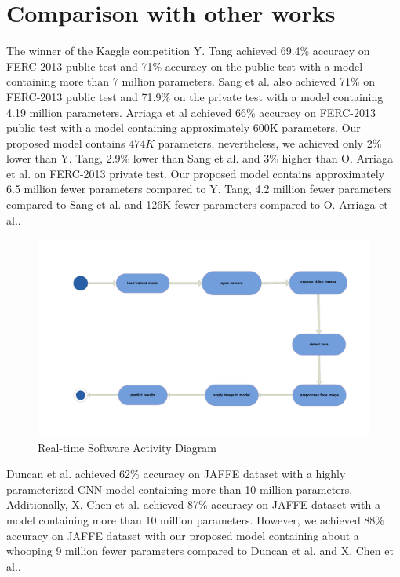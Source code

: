 \documentclass[master]{thesis-uestc}
\begin{document}
\section{Comparison with other works}
The winner of the Kaggle competition Y. Tang achieved 69.4\% accuracy on FERC-2013 public test and 71\% accuracy on the public test with a model containing more than 7 million parameters. Sang et al. also achieved 71\% on FERC-2013 public test and 71.9\% on the private test with a model containing 4.19 million parameters. Arriaga et al achieved 66\% accuracy on FERC-2013 public test with a model containing approximately 600K parameters. Our proposed model contains $474K$ parameters, nevertheless, we achieved only $2\%$ lower than Y. Tang, 2.9\% lower than Sang et al. and 3\% higher than O. Arriaga et al. on FERC-2013 private test. Our proposed model contains approximately 6.5 million fewer parameters compared to Y. Tang, 4.2 million fewer parameters compared to Sang et al. and 126K fewer parameters compared to O. Arriaga et al..

\begin{figure}[ht]
\includegraphics[width=6in]{pic/activity_diagram.pdf}
\caption{Real-time Software Activity Diagram}
\label{system_description}
\end{figure}

Duncan et al. achieved 62\% accuracy on JAFFE dataset with a highly parameterized CNN model containing more than 10 million parameters. Additionally, X. Chen et al. achieved 87\% accuracy on JAFFE dataset with a model containing more than 10 million parameters. However, we achieved $88\%$ accuracy on JAFFE dataset with our proposed model containing about a whooping 9 million fewer parameters compared to Duncan et al. and X. Chen et al..
\end{document}
